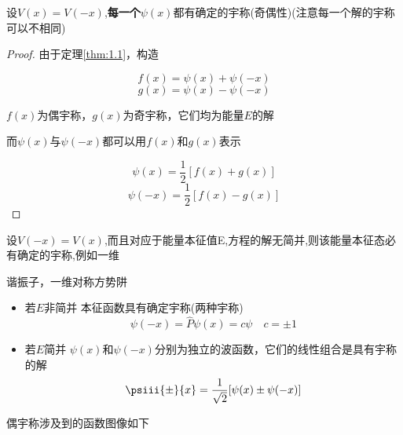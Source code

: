         \begin{thm}\label{thm:1.2}
            \thmindent
            
            设$V(x)=V(-x)$,\textbf{每一个}$\psi(x)$都有确定的宇称(奇偶性)(注意每一个解的宇称可以不相同)
            
            \begin{proof}
                \pfindent
                
                由于定理\ref{thm:1.1}，构造 
                   
                    $$ f(x) = \psi(x)+\psi(-x) $$                          %
                    $$ g(x) = \psi(x)-\psi(-x) $$
                
                $f(x)$为偶宇称，$g(x)$为奇宇称，它们均为能量$E$的解       \par  %
                而$\psi(x)$与$\psi(-x)$都可以用$f(x)$和$g(x)$表示    

                $$ \psi(x) = \frac{1}{2} [f(x)+g(x)]  $$
                $$ \psi(-x) = \frac{1}{2} [f(x)-g(x)] $$    

           \end{proof}
           
           \begin{corollary}\label{cl:1}
                \clindent 
                
                设$V(-x) = V(x)$,而且对应于能量本征值E,方程的解无简并,则该能量本征态必有确定的宇称,例如一维 \par
                谐振子，一维对称方势阱
                
                \begin{itemize}
                    \item 若$E$非简并  \quad 本征函数具有确定宇称(两种宇称) 
                        $$ \psi(-x) = \hat{P}\psi(x) = c\psi \quad c=\pm 1 $$ %
                    \item 若$E$简并 \quad $\psi(x)$和$\psi(-x)$分别为独立的波函数，它们的线性组合是具有宇称的解
                        $$ \psiii{\pm}{x} = \frac{1}{\sqrt{2}}[\psi(x) \pm \psi(-x)] $$
                \end{itemize}
            
           \end{corollary}

        \end{thm}
        \par
        偶宇称涉及到的函数图像如下

